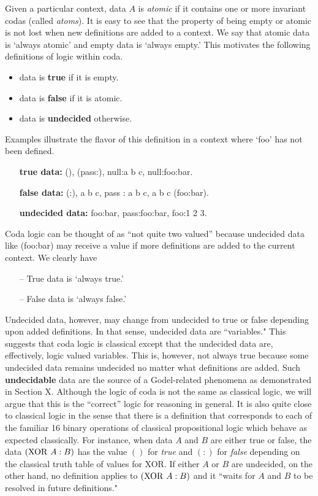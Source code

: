 \documentclass[11pt]{article}
\begin{document}
     Given a particular context, data $A$ is {\it atomic} if it contains
one or more invariant codas (called {\it atoms}).   It is easy to see that the property of being empty or atomic is not lost when
new definitions are added to a context.  We say that atomic data is `always atomic' and empty data is `always empty.'
This motivates the following definitions of logic within coda.
\begin{itemize}
\item data is {\bf true} if it is empty.
\item data is {\bf false} if it is atomic.
\item data is {\bf undecided} otherwise.
\end{itemize}
Examples illustrate the flavor of this definition in a context where `foo' has not been defined.
\begin{itemize}
\item[] {\bf true data:} (), (pass:), null:a b c, null:foo:bar.
\item[] {\bf false data:} (:), a b c, pass : a b c, a b c (foo:bar).
\item[] {\bf undecided data:}  foo:bar, pass:foo:bar, foo:1 2 3.
\end{itemize}
Coda logic can be thought of as ``not quite two valued'' because undecided data like (foo:bar) may receive a value if more definitions are added to the current context.
We clearly have
\begin{itemize}
\item[--] True data is `always true.'
\item[--] False data is `always false.'
\end{itemize}
Undecided data, however, may change from undecided to true or false depending upon added definitions.  In that sense, undecided data are ``variables."
This suggests that coda logic is classical except that
the undecided data are, effectively, logic valued variables.  This is, however, not always true because some undecided data remains
undecided no matter what definitions are added.  Such {\bf undecidable}
data are the source of a Godel-related phenomena as demonstrated in Section X.
Although the logic of coda is not the same as classical logic, we will argue that this is the ``correct'' logic for reasoning in general.
It is also quite close to classical logic in the
sense that there is a definition that corresponds to each of the familiar 16 binary operations of classical propositional logic which behave as expected classically.  For instance, when data $A$ and $B$ are either true or false,
the data $({\rm XOR}\ A:B)$ has the value $()$ for {\it true} and $(:)$ for {\it false} depending on the classical truth table of values for XOR.  If either $A$ or $B$ are undecided, on the other hand,
no definition applies to $({\rm XOR}\ A:B)$ and it ``waits for $A$ and $B$ to be resolved in future definitions."
\end{document}

